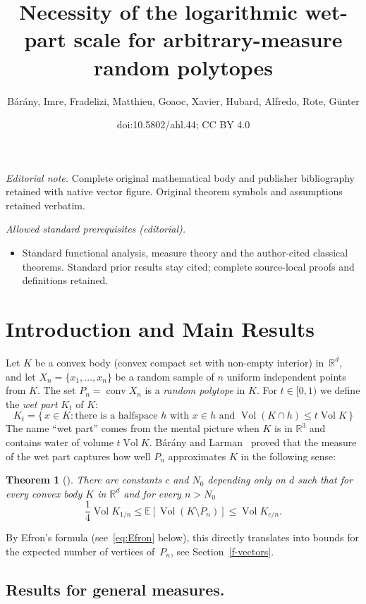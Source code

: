 \documentclass[10pt]{amsart}
\title{Necessity of the logarithmic wet-part scale for arbitrary-measure random polytopes}
\author{Bárány, Imre, Fradelizi, Matthieu, Goaoc, Xavier, Hubard, Alfredo, Rote, Günter}
\date{doi:10.5802/ahl.44; CC BY 4.0}
\newtheorem{theo}{Theorem}[section]
\theoremstyle{definition}\newtheorem{defi}[theo]{Definition}\newtheorem{rema}[theo]{Remark}\newtheorem{exam}[theo]{Example}\newtheorem{exem}[theo]{Example}\newtheorem{nota}[theo]{Notation}
\DeclareMathOperator{\vol}{Vol}
\DeclareMathOperator{\conv}{conv}
\newcommand{\Rbb}{\mathbb{R}}%
\newcommand{\Ebb}{\mathbb{E}}%
\begin{document}
\maketitle
\noindent\textit{Editorial note.} Complete original mathematical body and publisher bibliography retained with native vector figure. Original theorem symbols and assumptions retained verbatim.\par\medskip
\noindent\textit{Allowed standard prerequisites (editorial).}\begin{itemize}
\item Standard functional analysis, measure theory and the author-cited classical theorems. Standard prior results stay cited; complete source-local proofs and definitions retained.
\end{itemize}\medskip


\section{Introduction and Main Results}

Let $K$ be a convex body (convex compact set with non-empty interior) in~$\Rbb^d$, and let $X_n=\{x_1,\ldots,x_n\}$ be a random sample of $n$ uniform independent points from $K$. The set $P_n=\conv X_n$ is a \emph{random polytope} in $K$. For $t\in [0,1)$ we define the \emph{wet part} $K_t$ of $K$:
\[
K_t=\{\,x \in K: \text{there is a halfspace }h \text{ with } x \in h \text{ and }\vol(K\cap h) \le t\vol K\,\}
\]
The name ``wet part'' comes from the mental picture when $K$ is in $\Rbb^3$ and contains water of volume $t\vol K$. Bárány and Larman~\cite{BarLar} proved that the measure of the wet part captures how well $P_n$ approximates $K$ in the following sense:

\begin{theo}[{\cite[Theorem~1]{BarLar}}] \label{th:BL}
There are constants $c$ and $N_0$ depending only on $d$ such that for every convex body $K$ in $\Rbb^d$ and for every $n>N_0$
\[
\frac 14 \vol K_{1/n} \le \Ebb[\vol(K\setminus P_n)] \le \vol K_{c/n}.
\]
\end{theo}

By Efron's formula (see~\eqref{eq:Efron} below), this directly translates into bounds for the expected number of vertices of~$P_n$, see Section~\ref{f-vectors}.

\subsection{Results for general measures.}
\end{document}
